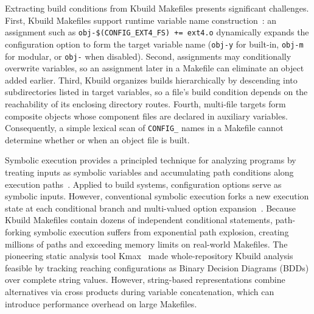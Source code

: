 \documentclass[acmsmall,screen,review,anonymous,nonacm]{acmart}
\begin{document}
  Extracting build conditions from Kbuild Makefiles presents significant challenges.
  First, Kbuild Makefiles support runtime variable name construction~\cite{gazzillo2017kmax}: an assignment such as
  \texttt{obj-\$(\allowbreak CONFIG\_\allowbreak EXT4\_\allowbreak FS) += ext4.o}
  dynamically expands the configuration option to form the target variable name (\texttt{obj-y} for built-in, \texttt{obj-m} for modular, or \texttt{obj-} when disabled).
  Second, assignments may conditionally overwrite variables, so an assignment later in a Makefile can eliminate an object added earlier.
  Third, Kbuild organizes builds hierarchically by descending into subdirectories listed in target variables, so a file's build condition depends on the reachability of its enclosing directory routes.
  Fourth, multi-file targets form composite objects whose component files are declared in auxiliary variables.
  Consequently, a simple lexical scan of \texttt{CONFIG\_} names in a Makefile cannot determine whether or when an object file is built.

  Symbolic execution provides a principled technique for analyzing programs by treating inputs as symbolic variables and accumulating path conditions along execution paths~\cite{king1976symbolic}.
  Applied to build systems, configuration options serve as symbolic inputs.
  However, conventional symbolic execution forks a new execution state at each conditional branch and multi-valued option expansion~\cite{nguyen2020kbuild}.
  Because Kbuild Makefiles contain dozens of independent conditional statements, path-forking symbolic execution suffers from exponential path explosion, creating millions of paths and exceeding memory limits on real-world Makefiles.
  The pioneering static analysis tool Kmax~\cite{gazzillo2017kmax} made whole-repository Kbuild analysis feasible by tracking reaching configurations as Binary Decision Diagrams (BDDs) over complete string values.
  However, string-based representations combine alternatives via cross products during variable concatenation, which can introduce performance overhead on large Makefiles.
\end{document}
